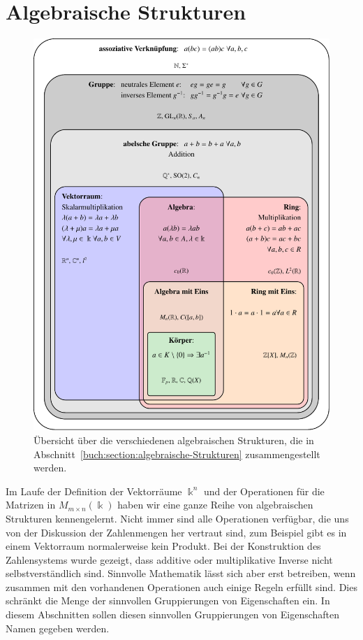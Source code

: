 %
%
%
\section{Algebraische Strukturen
\label{buch:section:algebraische-Strukturen}}
\begin{figure}
\centering
\includegraphics[width=\textwidth]{chapters/10-vektorenmatrizen/images/strukturen.pdf}
\caption{Übersicht über die verschiedenen algebraischen Strukturen, die
in Abschnitt~\ref{buch:section:algebraische-Strukturen} zusammengestellt
werden.
\label{buch:vektorenmatrizen:fig:strukturen}}
\end{figure}
Im Laufe der Definition der Vektorräume $\Bbbk^n$ und der
Operationen für die Matrizen in $M_{m\times n}(\Bbbk)$ haben
wir eine ganze Reihe von algebraischen Strukturen kennengelernt.
Nicht immer sind alle Operationen verfügbar, die uns von der Diskussion
der Zahlenmengen her vertraut sind, zum Beispiel gibt es in einem
Vektorraum normalerweise kein Produkt.
Bei der Konstruktion des Zahlensystems wurde gezeigt, dass
additive oder multiplikative Inverse nicht selbstverständlich
sind.
Sinnvolle Mathematik lässt sich aber erst betreiben, wenn zusammen
mit den vorhandenen Operationen auch einige Regeln erfüllt sind.
Dies schränkt die Menge der sinnvollen Gruppierungen von Eigenschaften
ein.
In diesem Abschnitten sollen diesen sinnvollen Gruppierungen von
Eigenschaften Namen gegeben werden.








